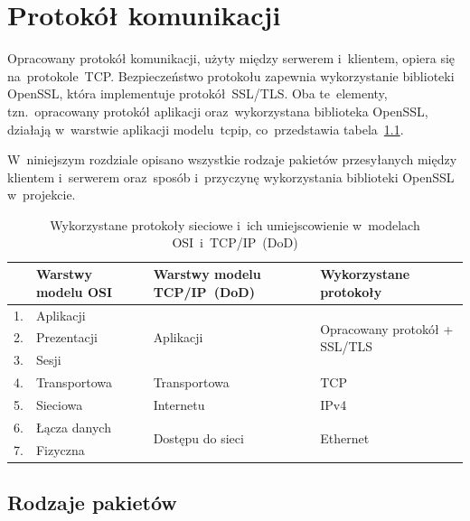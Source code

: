 \documentclass[thesis]{subfiles}
\begin{document}
\chapter{Protokół komunikacji}
\label{chapter:protokol}

Opracowany protokół komunikacji, użyty między serwerem i~klientem, opiera się na~protokole~TCP. Bezpieczeństwo protokołu zapewnia wykorzystanie biblioteki OpenSSL, która implementuje protokół~SSL/TLS. Oba te~elementy, tzn.~opracowany protokół aplikacji oraz~wykorzystana biblioteka OpenSSL, działają w~warstwie aplikacji modelu~\gls{tcpip}, co~przedstawia tabela~\ref{fig:protocol-big-view}.

W~niniejszym rozdziale opisano wszystkie rodzaje pakietów przesyłanych między klientem i~serwerem oraz~sposób i~przyczynę wykorzystania biblioteki OpenSSL w~projekcie.

\begin{table}
\centering
\renewcommand{\arraystretch}{1.3}
\begin{tabular}{l|l|l|l}
	   & Warstwy modelu OSI & Warstwy modelu TCP/IP~(DoD)       & Wykorzystane protokoły \\\hline\hline
	1. & Aplikacji          & \multirow{3}{*}{Aplikacji}        & \multirow{3}{*}{\parbox{3.5cm}{Opracowany \mbox{protokół} + SSL/TLS}} \\\cline{1-2}
	2. & Prezentacji        &                                   & \\\cline{1-2}
	3. & Sesji              &                                   & \\\hline
	4. & Transportowa       & Transportowa                      & TCP \\\hline
	5. & Sieciowa           & Internetu                         & IPv4 \\\hline
	6. & Łącza danych       & \multirow{2}{*}{Dostępu do sieci} & \multirow{2}{*}{Ethernet} \\\cline{1-2}
	7. & Fizyczna           &                                   &
\end{tabular}
\caption{Wykorzystane protokoły sieciowe i~ich umiejscowienie w~modelach OSI~i~TCP/IP~(DoD)}
\label{fig:protocol-big-view}
\end{table}


\section{Rodzaje pakietów}
\end{document}
